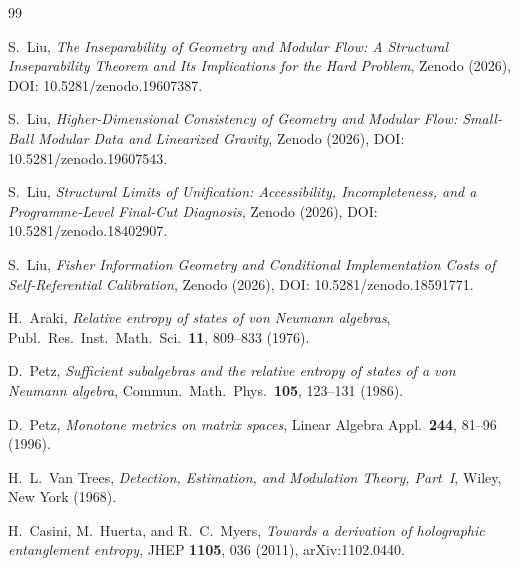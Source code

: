 \documentclass[12pt]{article}
\theoremstyle{definition}
\theoremstyle{remark}
\begin{document}
\begin{thebibliography}{99}

S.~Liu, \emph{The Inseparability of Geometry and Modular Flow: A Structural Inseparability Theorem and Its Implications for the Hard Problem}, Zenodo (2026), DOI: 10.5281/zenodo.19607387.

S.~Liu, \emph{Higher-Dimensional Consistency of Geometry and Modular Flow: Small-Ball Modular Data and Linearized Gravity}, Zenodo (2026), DOI: 10.5281/zenodo.19607543.

S.~Liu, \emph{Structural Limits of Unification: Accessibility, Incompleteness, and a Programme-Level Final-Cut Diagnosis}, Zenodo (2026), DOI: 10.5281/zenodo.18402907.

S.~Liu, \emph{Fisher Information Geometry and Conditional Implementation Costs of Self-Referential Calibration}, Zenodo (2026), DOI: 10.5281/zenodo.18591771.

H.~Araki,
\emph{Relative entropy of states of von Neumann algebras},
Publ.\ Res.\ Inst.\ Math.\ Sci.\ \textbf{11}, 809--833 (1976).

D.~Petz,
\emph{Sufficient subalgebras and the relative entropy of states of a von Neumann algebra},
Commun.\ Math.\ Phys.\ \textbf{105}, 123--131 (1986).

D.~Petz,
\emph{Monotone metrics on matrix spaces},
Linear Algebra Appl.\ \textbf{244}, 81--96 (1996).

H.~L.~Van Trees,
\emph{Detection, Estimation, and Modulation Theory, Part~I},
Wiley, New York (1968).

H.~Casini, M.~Huerta, and R.~C.~Myers,
\emph{Towards a derivation of holographic entanglement entropy},
JHEP \textbf{1105}, 036 (2011),
arXiv:1102.0440.

\end{thebibliography}
 
\end{document}
